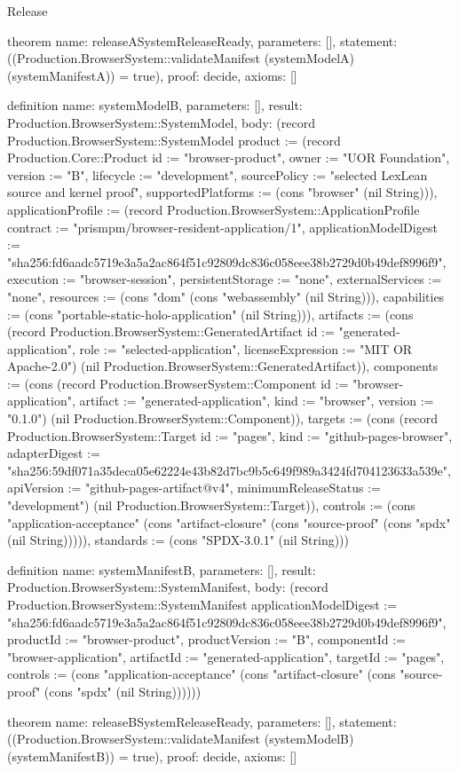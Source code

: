 \begin{lexlean}{Release}
\begin{semanticmodule}
theorem{
  name: releaseASystemReleaseReady,
  parameters: [],
  statement: ((Production.BrowserSystem::validateManifest (systemModelA) (systemManifestA)) = true),
  proof: decide{},
  axioms: []
}

definition{
  name: systemModelB,
  parameters: [],
  result: Production.BrowserSystem::SystemModel,
  body: (record Production.BrowserSystem::SystemModel {product := (record Production.Core::Product {id := "browser-product", owner := "UOR Foundation", version := "B", lifecycle := "development", sourcePolicy := "selected LexLean source and kernel proof", supportedPlatforms := (cons "browser" (nil String))}), applicationProfile := (record Production.BrowserSystem::ApplicationProfile {contract := "prismpm/browser-resident-application/1", applicationModelDigest := "sha256:fd6aadc5719e3a5a2ac864f51c92809dc836c058eee38b2729d0b49def8996f9", execution := "browser-session", persistentStorage := "none", externalServices := "none", resources := (cons "dom" (cons "webassembly" (nil String))), capabilities := (cons "portable-static-holo-application" (nil String))}), artifacts := (cons (record Production.BrowserSystem::GeneratedArtifact {id := "generated-application", role := "selected-application", licenseExpression := "MIT OR Apache-2.0"}) (nil Production.BrowserSystem::GeneratedArtifact)), components := (cons (record Production.BrowserSystem::Component {id := "browser-application", artifact := "generated-application", kind := "browser", version := "0.1.0"}) (nil Production.BrowserSystem::Component)), targets := (cons (record Production.BrowserSystem::Target {id := "pages", kind := "github-pages-browser", adapterDigest := "sha256:59df071a35deca05e62224e43b82d7bc9b5c649f989a3424fd704123633a539e", apiVersion := "github-pages-artifact@v4", minimumReleaseStatus := "development"}) (nil Production.BrowserSystem::Target)), controls := (cons "application-acceptance" (cons "artifact-closure" (cons "source-proof" (cons "spdx" (nil String))))), standards := (cons "SPDX-3.0.1" (nil String))})
}

definition{
  name: systemManifestB,
  parameters: [],
  result: Production.BrowserSystem::SystemManifest,
  body: (record Production.BrowserSystem::SystemManifest {applicationModelDigest := "sha256:fd6aadc5719e3a5a2ac864f51c92809dc836c058eee38b2729d0b49def8996f9", productId := "browser-product", productVersion := "B", componentId := "browser-application", artifactId := "generated-application", targetId := "pages", controls := (cons "application-acceptance" (cons "artifact-closure" (cons "source-proof" (cons "spdx" (nil String)))))})
}

theorem{
  name: releaseBSystemReleaseReady,
  parameters: [],
  statement: ((Production.BrowserSystem::validateManifest (systemModelB) (systemManifestB)) = true),
  proof: decide{},
  axioms: []
}
\end{semanticmodule}
\end{lexlean}
